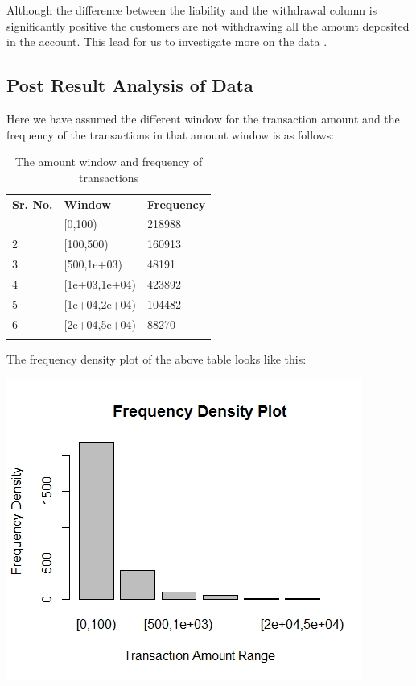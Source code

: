 Although the difference between the liability and the withdrawal column is significantly positive the customers are not withdrawing all the amount deposited in the account. This lead for us to investigate more on the data .

\subsection{Post Result Analysis of Data}

Here we have assumed the different window for the transaction amount and the frequency of the transactions in that amount window is as follows:

\begin{table}[h!]
  \begin{center}
    \caption{The amount window and frequency of transactions}
    \label{tab:The amount window and frequency of transactions}
    \begin{tabular}{l|l|l} %
      \hline
      \textbf{Sr. No.} & \textbf{Window} & \textbf{Frequency}\\
	\hdashline
	\hdashline
      1  &     [0,100) & 218988\\
	\hline
	2  &   [100,500) & 160913\\
	\hline
	3  & [500,1e+03) & 48191\\
	\hline
	4  & [1e+03,1e+04) & 423892\\
	\hline
	5 &  [1e+04,2e+04) & 104482\\
	\hline
	6 &  [2e+04,5e+04) & 88270\\
	\hdashline
	\hline
    \end{tabular}
  \end{center}
\end{table}

The frequency density plot of the above table looks like this:
				\begin{center}
				\includegraphics[width=\linewidth]{figures/freq-density-plot.jpeg}	
				\label{fig: Frequency density plot of the Transaction Amount}
				\end{center}

